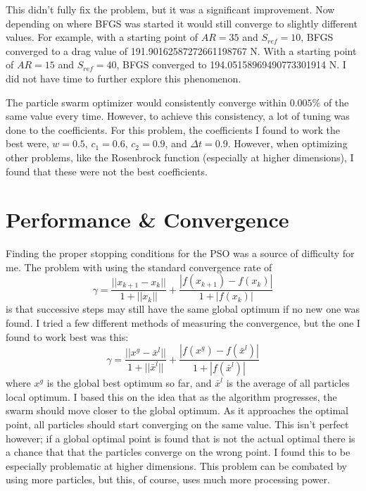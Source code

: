 \documentclass[12pt,parskip=full]{article}
\numberwithin{subsection}{section}
\begin{document}
		This didn't fully fix the problem, but it was a significant improvement. Now depending on where BFGS was
		started it would still converge to slightly different values. For example, with a starting point of
		$AR = 35$ and $S_{ref} = 10$, BFGS converged to a drag value of 191.90162587272661198767 N. With a starting
		point of $AR = 15$ and $S_{ref} = 40$, BFGS converged to 194.05158969490773301914 N. I did not have time to
		further explore this phenomenon.
		
		The particle swarm optimizer would consistently converge within $0.005\%$ of the same value every time.
		However, to achieve this consistency, a lot of tuning was done to the coefficients. For this problem,
		the coefficients I found to work the best were, $w = 0.5$, $c_1 = 0.6$, $c_2 = 0.9$, and $\Delta t = 0.9$.
		However, when optimizing other problems, like the Rosenbrock function (especially at higher dimensions), 
		I found that these were not the best coefficients.
		
	\section{Performance \& Convergence}
		Finding the proper stopping conditions for the PSO was a source of difficulty for me. The problem with using
		the standard convergence rate of
		\begin{equation}
			\gamma = \frac{ || x_{k+1} - x_k || }{1 + || x_k ||} + \frac{ | f(x_{k+1}) - f(x_k) | }{1 + | f(x_k) | }
		\end{equation}
		is that successive steps may still have the same global optimum if no new one was found. I tried a few
		different methods of measuring the convergence, but the one I found to work best was this:
		\begin{equation}
			\gamma = \frac{ || x^g - \bar x^l || }{1 + || \bar x^l ||} + \frac{ | f(x^g) - f(\bar x^l) | }{1 + | f(\bar x^l) | }
		\end{equation}
		where $x^g$ is the global best optimum so far, and $\bar x^l$ is the average of all particles local optimum.
		I based this on the idea that as the algorithm progresses, the swarm should move closer to the global optimum.
		As it approaches the optimal point, all particles should start converging on the same value. This isn't perfect
		however; if a global optimal point is found that is not the actual optimal there is a chance that that the
		particles converge on the wrong point. I found this to be especially problematic at higher dimensions. This
		problem can be combated by using more particles, but this, of course, uses much more processing power.
		
\end{document}
